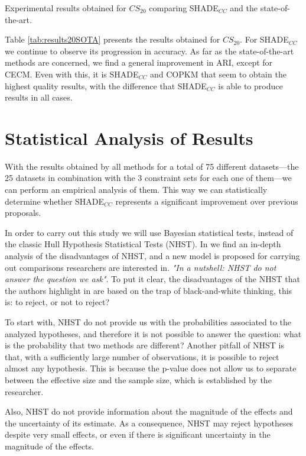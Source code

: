 \documentclass[review]{elsarticle}
\begin{document}
\begin{table}[!h]
	\caption{Experimental results obtained for $CS_{20}$ comparing SHADE$_{CC}$ and the state-of-the-art.}
	\label{tab:results20SOTA}
\end{table}

Table \ref{tab:results20SOTA} presents the results obtained for $CS_{20}$. For SHADE$_{CC}$ we continue to observe its progression in accuracy. As far as the state-of-the-art methods are concerned, we find a general improvement in ARI, except for CECM. Even with this, it is SHADE$_{CC}$ and COPKM that seem to obtain the highest quality results, with the difference that SHADE$_{CC}$ is able to produce results in all cases.

\clearpage

\section{Statistical Analysis of Results} \label{sec:analisis}

With the results obtained by all methods for a total of 75 different datasets---the 25 datasets in combination with the 3 constraint sets for each one of them---we can perform an empirical analysis of them. This way we can statistically determine whether SHADE$_{CC}$ represents a significant improvement over previous proposals.

In order to carry out this study we will use Bayesian statistical tests, instead of the classic Hull Hypothesis Statistical Tests (NHST). In \cite{benavoli2017time} we find an in-depth analysis of the disadvantages of NHST, and a new model is proposed for carrying out comparisons researchers are interested in. \textit{"In a nutshell: NHST do not answer the question we ask"}. To put it clear, the disadvantages of the NHST that the authors highlight in \cite{benavoli2017time} are based on the trap of black-and-white thinking, this is: to reject, or not to reject?

To start with, NHST do not provide us with the probabilities associated to the analyzed hypotheses, and therefore it is not possible to answer the question: what is the probability that two methods are different? Another pitfall of NHST is that, with a sufficiently large number of observations, it is possible to reject almost any hypothesis. This is because the p-value does not allow us to separate between the effective size and the sample size, which is established by the researcher.

Also, NHST do not provide information about the magnitude of the effects and the uncertainty of its estimate. As a consequence, NHST may reject hypotheses despite very small effects, or even if there is significant uncertainty in the magnitude of the effects.
\end{document}
